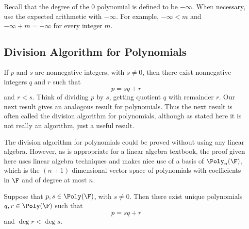 %
Recall that the degree of the $0$ polynomial is defined to be $-\infty$. When
necessary, use the expected arithmetic with $-\infty$. For example,
$-\infty<m$ and $-\infty+m=-\infty$ for every integer $m$.

\subsection{Division Algorithm for Polynomials}

If $p$ and $s$ are nonnegative integers, with $s\ne0$, then there exist
nonnegative integers $q$ and $r$ such that
\[ p = sq+r \]
and $r<s$. Think of dividing $p$ by $s$, getting quotient $q$ with remainder
$r$. Our next result gives an analogous result for polynomials. Thus the next
result is often called the division algorithm for polynomials, although as
stated here it is not really an algorithm, just a useful result.

%
The division algorithm for polynomials could be proved without using any linear
algebra. However, as is appropriate for a linear algebra textbook, the proof
given here uses linear algebra techniques and makes nice use of a basis of
$\Poly_n(\F)$, which is the $(n+1)$-dimensional vector space of polynomials
with coefficients in $\F$ and of degree at most $n$.

\begin{result}\label{ax:4.9}
Suppose that $p,s\in\Poly(\F)$, with $s\ne0$. Then there exist unique
polynomials $q,r\in\Poly(\F)$ such that
\[ p = sq+r \]
and $\deg r<\deg s$.
\end{result}

